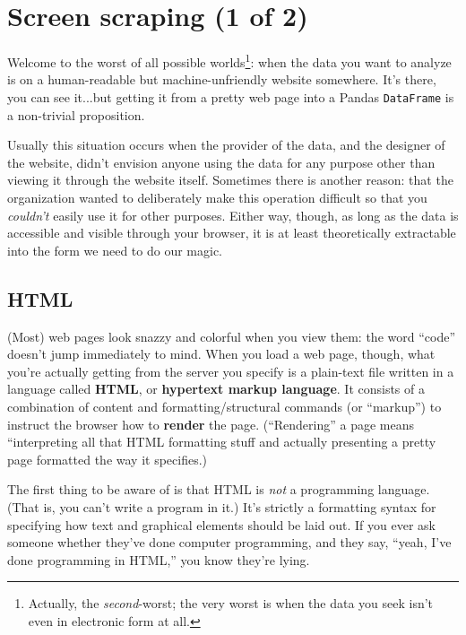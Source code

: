 \chapter{Screen scraping (1 of 2)}
\label{ch:screenScraping1}


Welcome to the worst of all possible worlds\footnote{Actually, the
\textit{second}-worst; the very worst is when the data you seek isn't even in
electronic form at all.}: when the data you want to analyze is on a
human-readable but machine-unfriendly website somewhere. It's there, you can
see it...but getting it from a pretty web page into a Pandas \texttt{DataFrame}
is a non-trivial proposition.

Usually this situation occurs when the provider of the data, and the designer
of the website, didn't envision anyone using the data for any purpose other
than viewing it through the website itself. Sometimes there is another reason:
that the organization wanted to deliberately make this operation difficult so
that you \textit{couldn't} easily use it for other purposes. Either way,
though, as long as the data is accessible and visible through your browser, it
is at least theoretically extractable into the form we need to do our magic.

\section{HTML}

(Most) web pages look snazzy and colorful when you view them: the word ``code''
doesn't jump immediately to mind. When you load a web page, though, what you're
actually getting from the server you specify is a plain-text file written in a
language called \textbf{HTML}, or \textbf{hypertext markup language}. It
consists of a combination of content and formatting/structural commands (or
``markup'') to instruct the browser how to \textbf{render} the page.
(``Rendering'' a page means ``interpreting all that HTML formatting stuff and
actually presenting a pretty page formatted the way it specifies.)

The first thing to be aware of is that HTML is \textit{not} a programming
language. (That is, you can't write a program in it.) It's strictly a
formatting syntax for specifying how text and graphical elements should be laid
out. If you ever ask someone whether they've done computer programming, and
they say, ``yeah, I've done programming in HTML,'' you know they're lying.

